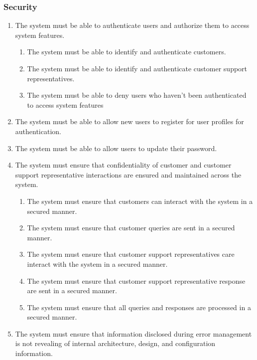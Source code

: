 \documentclass[11pt]{article}
\begin{document}
\subsubsection{Security}
\begin{enumerate}[label=R1.\arabic*.]
	\item The system must be able to authenticate users and authorize them to access system features.
	\begin{enumerate}[label*=\arabic*.]
		\item The system must be able to identify and authenticate customers.
		\item The system must be able to identify and authenticate customer support representatives.
		\item The system must be able to deny users who haven't been authenticated to access system features
	\end{enumerate}
	\item The system must be able to allow new users to register for user profiles for authentication.
	\item The system must be able to allow users to update their password.
	\item The system must ensure that confidentiality of customer and customer support representative interactions are ensured and maintained across the system.
	\begin{enumerate}[label*=\arabic*.]
		\item The system must ensure that customers can interact with the system in a secured manner.
		\item The system must ensure that customer queries are sent in a secured manner.
		\item The system must ensure that customer support representatives care interact with the system in a secured manner.
		\item The system must ensure that customer support representative response are sent in a secured manner.
		\item The system must ensure that all queries and responses are processed in a secured manner.
	\end{enumerate}
	\item The system must ensure that information disclosed during error management is not revealing of internal architecture, design, and configuration information.
\end{enumerate}
\end{document}

